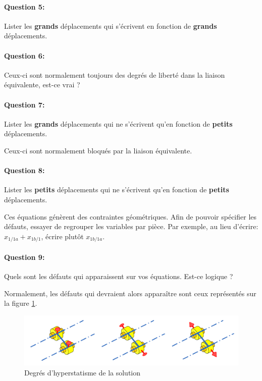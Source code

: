 \newpage

\paragraph{Question 5:} Lister les \textbf{grands} déplacements qui s'écrivent en fonction de \textbf{grands} déplacements.

\reponse[4]

\paragraph{Question 6:} Ceux-ci sont normalement toujours des degrés de liberté dans la liaison équivalente, est-ce vrai ?

\reponse[2]

\paragraph{Question 7:} Lister les \textbf{grands} déplacements qui ne s'écrivent qu'en fonction de \textbf{petits} déplacements.

\reponse[4]

Ceux-ci sont normalement bloqués par la liaison équivalente.

\paragraph{Question 8:} Lister les \textbf{petits} déplacements qui ne s'écrivent qu'en fonction de \textbf{petits} déplacements.

\reponse[4]

Ces équations génèrent des contraintes géométriques. Afin de pouvoir spécifier les défauts, essayer de regrouper les variables par pièce. Par exemple, au lieu d'écrire: $x_{1/1a}+x_{1b/1}$, écrire plutôt $x_{1b/1a}$.

\paragraph{Question 9:} Quels sont les défauts qui apparaissent sur vos équations. Est-ce logique ?

\reponse[2]

Normalement, les défauts qui devraient alors apparaître sont ceux représentés sur la figure \ref{degres_hyp}.

\begin{figure}[h!]
\begin{center}
\includegraphics[width=0.8\linewidth]{img/Fig2.png}
\caption{Degrés d'hyperstatisme de la solution}
\label{degres_hyp}
\end{center}
\end{figure}

